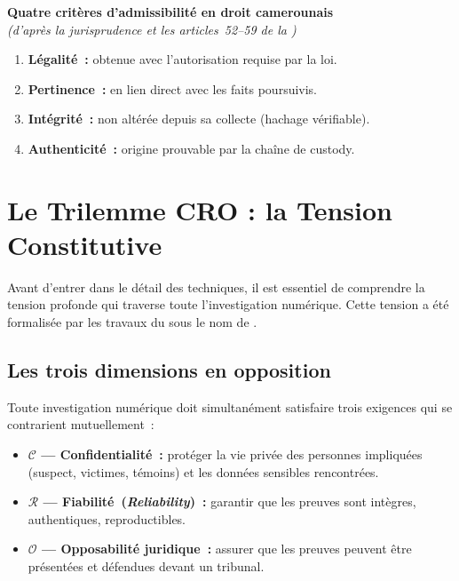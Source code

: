 \begin{boxjuris}
\textbf{Quatre critères d'admissibilité en droit camerounais}\\
\textit{(d'après la jurisprudence et les articles~52--59 de la )}

\begin{enumerate}
    \item \textbf{Légalité~:} obtenue avec l'autorisation requise par la loi.
    \item \textbf{Pertinence~:} en lien direct avec les faits poursuivis.
    \item \textbf{Intégrité~:} non altérée depuis sa collecte (hachage vérifiable).
    \item \textbf{Authenticité~:} origine prouvable par la chaîne de custody.
\end{enumerate}
\end{boxjuris}

\section{Le Trilemme CRO : la Tension Constitutive}
\label{sec:trilemme-intro}

Avant d'entrer dans le détail des techniques, il est essentiel de comprendre
la tension profonde qui traverse toute l'investigation numérique. Cette tension
a été formalisée par les travaux du  sous le nom de
 \cite{minka2025cro}.

\subsection{Les trois dimensions en opposition}

Toute investigation numérique doit simultanément satisfaire trois exigences
qui se contrarient mutuellement~:

\begin{itemize}
    \item \textbf{$\mathcal{C}$ --- Confidentialité~:} protéger la vie privée
          des personnes impliquées (suspect, victimes, témoins) et les données
          sensibles rencontrées.
    \item \textbf{$\mathcal{R}$ --- Fiabilité~(\textit{Reliability})~:} garantir
          que les preuves sont intègres, authentiques, reproductibles.
    \item \textbf{$\mathcal{O}$ --- Opposabilité juridique~:} assurer que les
          preuves peuvent être présentées et défendues devant un tribunal.
\end{itemize}

